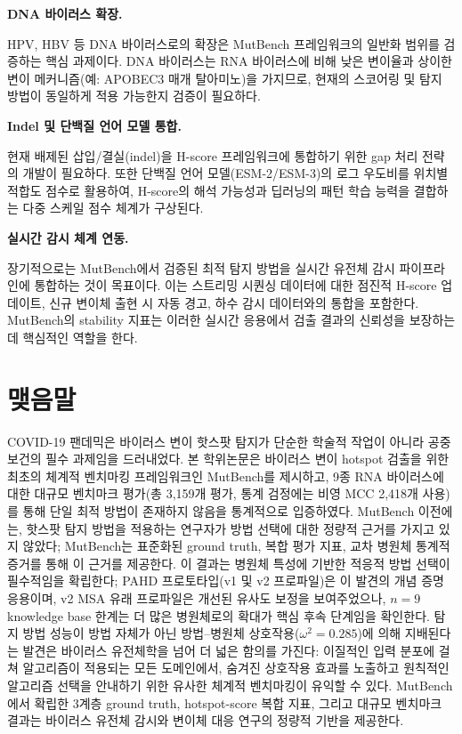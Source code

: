 \textbf{DNA 바이러스 확장.}

HPV, HBV 등 DNA 바이러스로의 확장은 MutBench 프레임워크의 일반화 범위를 검증하는 핵심 과제이다.
DNA 바이러스는 RNA 바이러스에 비해 낮은 변이율과 상이한 변이 메커니즘(예: APOBEC3 매개 탈아미노)을 가지므로, 현재의 스코어링 및 탐지 방법이 동일하게 적용 가능한지 검증이 필요하다.

\textbf{Indel 및 단백질 언어 모델 통합.}

현재 배제된 삽입/결실(indel)을 H-score 프레임워크에 통합하기 위한 gap 처리 전략의 개발이 필요하다.
또한 단백질 언어 모델(ESM-2/ESM-3)의 로그 우도비를 위치별 적합도 점수로 활용하여, H-score의 해석 가능성과 딥러닝의 패턴 학습 능력을 결합하는 다중 스케일 점수 체계가 구상된다.

\textbf{실시간 감시 체계 연동.}

장기적으로는 MutBench에서 검증된 최적 탐지 방법을 실시간 유전체 감시 파이프라인에 통합하는 것이 목표이다.
이는 스트리밍 시퀀싱 데이터에 대한 점진적 H-score 업데이트, 신규 변이체 출현 시 자동 경고, 하수 감시 데이터와의 통합을 포함한다.
MutBench의 stability 지표는 이러한 실시간 응용에서 검출 결과의 신뢰성을 보장하는 데 핵심적인 역할을 한다.

\section{맺음말}
\label{sec:final_conclusion}

COVID-19 팬데믹은 바이러스 변이 핫스팟 탐지가 단순한 학술적 작업이 아니라 공중보건의 필수 과제임을 드러내었다.
본 학위논문은 바이러스 변이 hotspot 검출을 위한 최초의 체계적 벤치마킹 프레임워크인 MutBench를 제시하고, 9종 RNA 바이러스에 대한 대규모 벤치마크 평가(총 3,159개 평가, 통계 검정에는 비영 MCC 2,418개 사용)를 통해 단일 최적 방법이 존재하지 않음을 통계적으로 입증하였다.
MutBench 이전에는, 핫스팟 탐지 방법을 적용하는 연구자가 방법 선택에 대한 정량적 근거를 가지고 있지 않았다; MutBench는 표준화된 ground truth, 복합 평가 지표, 교차 병원체 통계적 증거를 통해 이 근거를 제공한다.
이 결과는 병원체 특성에 기반한 적응적 방법 선택이 필수적임을 확립한다; PAHD 프로토타입(v1 및 v2 프로파일)은 이 발견의 개념 증명 응용이며, v2 MSA 유래 프로파일은 개선된 유사도 보정을 보여주었으나, $n = 9$ knowledge base 한계는 더 많은 병원체로의 확대가 핵심 후속 단계임을 확인한다.
탐지 방법 성능이 방법 자체가 아닌 방법--병원체 상호작용($\omega^2 = 0.285$)에 의해 지배된다는 발견은 바이러스 유전체학을 넘어 더 넓은 함의를 가진다: 이질적인 입력 분포에 걸쳐 알고리즘이 적용되는 모든 도메인에서, 숨겨진 상호작용 효과를 노출하고 원칙적인 알고리즘 선택을 안내하기 위한 유사한 체계적 벤치마킹이 유익할 수 있다.
MutBench에서 확립한 3계층 ground truth, hotspot-score 복합 지표, 그리고 대규모 벤치마크 결과는 바이러스 유전체 감시와 변이체 대응 연구의 정량적 기반을 제공한다.

